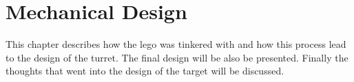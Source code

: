 \chapter{Mechanical Design}

This chapter describes how the lego was tinkered with and how this process
lead to the design of the turret. The final design will be also be presented.
Finally the thoughts that went into the design of the target will be discussed.



